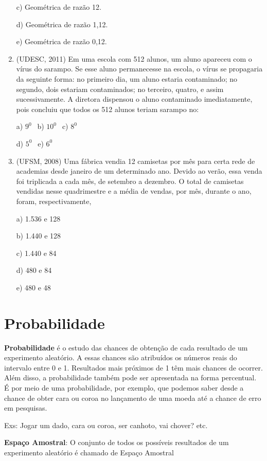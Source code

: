 \begin{multicols*}{2}
\begin{enumerate}
c) Geométrica de razão 12.

d) Geométrica de razão 1,12.

e) Geométrica de razão 0,12.

\item (UDESC, 2011) Em uma escola com 512 alunos, um aluno apareceu com o vírus do sarampo. Se esse aluno permanecesse na escola, o vírus se propagaria da seguinte forma: no primeiro dia, um aluno estaria contaminado; no segundo, dois estariam contaminados; no terceiro, quatro, e assim sucessivamente. A diretora dispensou o aluno contaminado imediatamente, pois concluiu que todos os 512 alunos teriam sarampo no:

		a) $9^0 \ \ $ b) $10^0 \ \ $ c) $8^0 \ \ $ 
		
		d) $5^0 \ \ $ e) $6^0 $

\item (UFSM, 2008) Uma fábrica vendia 12 camisetas por mês para certa rede de academias desde janeiro de um determinado ano. Devido ao verão, essa venda foi triplicada a cada mês, de setembro a dezembro. O total de camisetas vendidas nesse quadrimestre e a média de vendas, por mês, durante o ano, foram, respectivamente,

a) 1.536 e 128

b) 1.440 e 128

c) 1.440 e 84

d) 480 e 84

e) 480 e 48



\end{enumerate}

	\section*{Probabilidade}
	
	\textbf{Probabilidade} é o estudo das chances de obtenção de cada resultado de um experimento aleatório. A essas chances são atribuídos os números reais do intervalo entre 0 e 1. Resultados mais próximos de 1 têm mais chances de ocorrer. Além disso, a probabilidade também pode ser apresentada na forma percentual. É por meio de uma probabilidade, por exemplo, que podemos saber desde a chance de obter cara ou coroa no lançamento de uma moeda até a chance de erro em pesquisas.
	
	Exs: Jogar um dado, cara ou coroa, ser canhoto, vai chover? etc.
	
	\textbf{Espaço Amostral}: O conjunto de todos os possíveis resultados de um experimento aleatório é chamado de Espaço Amostral
	

\end{multicols*}
